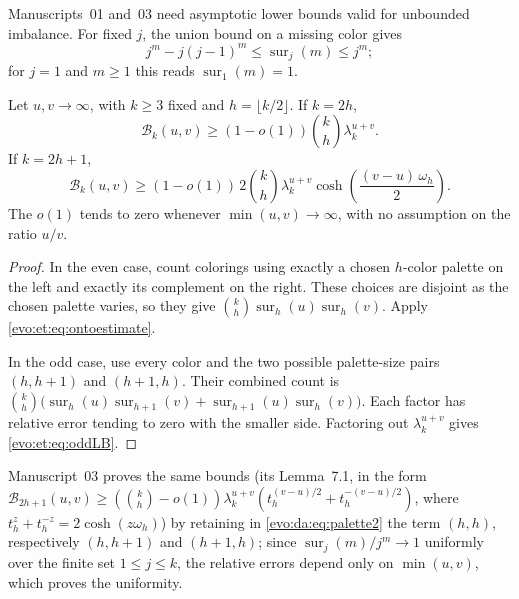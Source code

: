 \documentclass[11pt,a4paper]{article}
\numberwithin{equation}{section}
\theoremstyle{definition}
\theoremstyle{remark}
\newcommand{\Bip}{\mathcal B}
\newcommand{\sur}{\operatorname{sur}}
\begin{document}
Manuscripts~01 and~03 need asymptotic lower bounds valid for unbounded
imbalance. For fixed $j$, the union bound on a missing color gives
\begin{equation}\label{evo:et:eq:ontoestimate}
 j^m-j(j-1)^m\le\sur_j(m)\le j^m;
\end{equation}
for $j=1$ and $m\ge1$ this reads $\sur_1(m)=1$.

\begin{lemma}\label{evo:et:lem:paletteLB}
Let $u,v\to\infty$, with $k\ge3$ fixed and $h=\lfloor k/2\rfloor$. If $k=2h$,
\begin{equation}\label{evo:et:eq:evenLB}
 \Bip_k(u,v)\ge(1-o(1))\binom kh\lambda_k^{u+v}.
\end{equation}
If $k=2h+1$,
\begin{equation}\label{evo:et:eq:oddLB}
 \Bip_k(u,v)\ge(1-o(1))\,2\binom kh\lambda_k^{u+v}
 \cosh\!\left(\frac{(v-u)\,\omega_h}2\right).
\end{equation}
The $o(1)$ tends to zero whenever $\min(u,v)\to\infty$, with no assumption on
the ratio $u/v$.
\end{lemma}
\begin{proof}
In the even case, count colorings using exactly a chosen $h$-color palette on
the left and exactly its complement on the right. These choices are disjoint
as the chosen palette varies, so they give $\binom kh\sur_h(u)\sur_h(v)$.
Apply \eqref{evo:et:eq:ontoestimate}.

In the odd case, use every color and the two possible palette-size pairs
$(h,h+1)$ and $(h+1,h)$. Their combined count is
$\binom kh\bigl(\sur_h(u)\sur_{h+1}(v)+\sur_{h+1}(u)\sur_h(v)\bigr)$. Each
factor has relative error tending to zero with the smaller side. Factoring
out $\lambda_k^{u+v}$ gives \eqref{evo:et:eq:oddLB}.
\end{proof}

Manuscript~03 proves the same bounds (its Lemma~7.1, in the form
$\Bip_{2h+1}(u,v)\ge(\binom kh-o(1))\lambda_k^{u+v}(t_h^{(v-u)/2}+t_h^{-(v-u)/2})$,
where $t_h^{z}+t_h^{-z}=2\cosh(z\omega_h)$) by retaining in
\eqref{evo:da:eq:palette2} the term $(h,h)$, respectively $(h,h+1)$ and
$(h+1,h)$; since $\sur_j(m)/j^m\to1$ uniformly over the finite set $1\le j\le
k$, the relative errors depend only on $\min(u,v)$, which proves the
uniformity.
\end{document}

